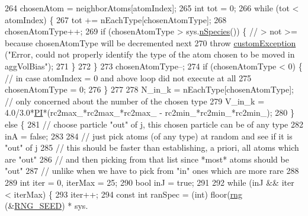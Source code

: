 \begin{DoxyCode}
264                     chosenAtom = neighborAtoms[atomIndex];
265                 \textcolor{keywordtype}{int} tot = 0;
266                     \textcolor{keywordflow}{while} (tot < atomIndex) \{
267                         tot += nEachType[chosenAtomType];
268                         chosenAtomType++;
269                         \textcolor{keywordflow}{if} (chosenAtomType > sys.\hyperlink{classsim_system_ab5e2e9b6204de15520302fe1d51688dd}{nSpecies}()) \{ \textcolor{comment}{// > not >= because chosenAtomType
       will be decremented next}
270                                 \textcolor{keywordflow}{throw} \hyperlink{classcustom_exception}{customException} (\textcolor{stringliteral}{"Error, could not properly identify
       the type of the atom chosen to be moved in aggVolBias"});
271                         \}
272                     \}
273                     chosenAtomType--;
274                     \textcolor{keywordflow}{if} (chosenAtomType < 0) \{ \textcolor{comment}{// in case atomIndex = 0 and above loop did not execute at
       all}
275                         chosenAtomType = 0;
276                     \}
277 
278             N\_in\_k = nEachType[chosenAtomType]; \textcolor{comment}{// only concerned about the number of the chosen type}
279             V\_in\_k = 4.0/3.0*\hyperlink{global_8h_a598a3330b3c21701223ee0ca14316eca}{PI}*(rc2max\_*rc2max\_*rc2max\_ - rc2min\_*rc2min\_*rc2min\_);
280         \} \textcolor{keywordflow}{else} \{
281                     \textcolor{comment}{// choose particle "out" of j, this chosen particle can be of any type}
282                     inA = \textcolor{keyword}{false};
283 
284                     \textcolor{comment}{// just pick atoms (of any type) at random and see if it is "out" of j}
285                     \textcolor{comment}{// this should be faster than establishing, a priori, all atoms which are "out"}
286                     \textcolor{comment}{// and then picking from that list since *most* atoms should be "out"}
287                     \textcolor{comment}{// unlike when we have to pick from "in" ones which are more rare}
288 
289             \textcolor{keywordtype}{int} iter = 0, iterMax = 25;
290                     \textcolor{keywordtype}{bool} inJ = \textcolor{keyword}{true};
291 
292             \textcolor{keywordflow}{while} (inJ && iter < iterMax) \{
293                         iter++;
294                         \textcolor{keyword}{const} \textcolor{keywordtype}{int} ranSpec = (int) floor(\hyperlink{utilities_8cpp_a0f9542af4b475ac79cb679d7a8d14db0}{rng} (&\hyperlink{global_8h_a3f4e4ea24d5a5c66feae55d1f329c884}{RNG\_SEED}) * sys.

\end{DoxyCode}
